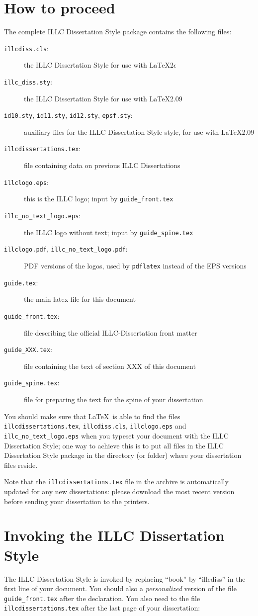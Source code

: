 \section{How to proceed}
The complete ILLC Dissertation Style package contains the following files:
\begin{description} 
\item[{\tt illcdiss.cls}:] the ILLC Dissertation Style for
use with \LaTeX 2$\epsilon$
\item[{\tt illc\_diss.sty}:] the ILLC Dissertation Style for
use with \LaTeX 2.09
\item[{\tt id10.sty}, {\tt id11.sty}, {\tt id12.sty}, {\tt epsf.sty}:] 
  auxiliary files for the ILLC Dissertation Style style,
  for use with \LaTeX 2.09
\item[{\tt illcdissertations.tex}:] file containing data on previous
  ILLC Dissertations
\item[{\tt illclogo.eps}:] this is the ILLC logo;
  input by {\tt guide\_front.tex}
\item[{\tt illc\_no\_text\_logo.eps}:] the ILLC logo without text;
  input by {\tt guide\_spine.tex}
\item[{\tt illclogo.pdf}, {\tt illc\_no\_text\_logo.pdf}:] PDF versions of the logos, used by {\tt pdflatex} instead of the EPS versions
\item[{\tt guide.tex}:] the main latex file for this document
\item[{\tt guide\_front.tex}:] file describing the official 
  ILLC-Dissertation front matter
\item[{\tt guide\_XXX.tex}:] file containing the text of section XXX of this 
document
\item[{\tt guide\_spine.tex}:] file for preparing the text 
  for the spine of your dissertation
\end{description}
You should make sure that \LaTeX\ is able to find the files
{\tt illcdissertations.tex}, {\tt illcdiss.cls}, {\tt illclogo.eps} and
{\tt illc\_no\_text\_logo.eps} when you 
typeset your document with the ILLC Dissertation Style; one way
to achieve this is to put all files in the ILLC Dissertation Style
package in the directory (or folder) where your dissertation files
reside.

Note that the {\tt illcdissertations.tex}
file in the archive is automatically updated for any new dissertations:
please download the most recent version 
before sending your dissertation to the printers.

\section{Invoking the ILLC Dissertation Style}
The ILLC Dissertation Style is invoked by replacing ``book'' by ``illcdiss''
in the first line of your document. You should also \verb|| 
a {\em personalized\/} version of the file {\tt guide\_front.tex} 
after the \verb|| declaration. 
You also need to \verb|| the file
\verb|illcdissertations.tex| after the last page of your dissertation:

